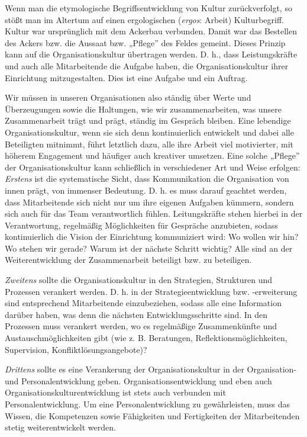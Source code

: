 \documentclass[
  letterpaper,
]{book}
\begin{document}
Wenn man die etymologische Begriffsentwicklung von Kultur
zurückverfolgt, so stößt man im Altertum auf einen ergologischen
(\emph{ergos}: Arbeit) Kulturbegriff. Kultur war ursprünglich mit dem
Ackerbau verbunden. Damit war das Bestellen des Ackers bzw. die Aussaat
bzw. „Pflege'' des Feldes gemeint. Dieses Prinzip kann auf die
Organisationskultur übertragen werden. D. h., dass Leistungskräfte und
auch alle Mitarbeitende die Aufgabe haben, die Organisationskultur ihrer
Einrichtung mitzugestalten. Dies ist eine Aufgabe und ein Auftrag.

Wir müssen in unseren Organisationen also ständig über Werte und
Überzeugungen sowie die Haltungen, wie wir zusammenarbeiten, was unsere
Zusammenarbeit trägt und prägt, ständig im Gespräch bleiben. Eine
lebendige Organisationskultur, wenn sie sich denn kontinuierlich
entwickelt und dabei alle Beteiligten mitnimmt, führt letztlich dazu,
alle ihre Arbeit viel motivierter, mit höherem Engagement und häufiger
auch kreativer umsetzen. Eine solche „Pflege'' der Organisationskultur
kann schließlich in verschiedener Art und Weise erfolgen: \emph{Erstens}
ist die systematische Sicht, dass Kommunikation die Organisation von
innen prägt, von immenser Bedeutung. D. h. es muss darauf geachtet
werden, dass Mitarbeitende sich nicht nur um ihre eigenen Aufgaben
kümmern, sondern sich auch für das Team verantwortlich fühlen.
Leitungskräfte stehen hierbei in der Verantwortung, regelmäßig
Möglichkeiten für Gespräche anzubieten, sodass kontinuierlich die Vision
der Einrichtung kommuniziert wird: Wo wollen wir hin? Wo stehen wir
gerade? Warum ist der nächste Schritt wichtig? Alle sind an der
Weiterentwicklung der Zusammenarbeit beteiligt bzw. zu beteiligen.

\emph{Zweitens} sollte die Organisationskultur in den Strategien,
Strukturen und Prozessen verankert werden. D. h. in der
Strategieentwicklung bzw. -erweiterung sind entsprechend Mitarbeitende
einzubeziehen, sodass alle eine Information darüber haben, was denn die
nächsten Entwicklungsschritte sind. In den Prozessen muss verankert
werden, wo es regelmäßige Zusammenkünfte und Austauschmöglichkeiten gibt
(wie z. B. Beratungen, Reflektionsmöglichkeiten, Supervision,
Konfliktlösungsangebote)?

\emph{Drittens} sollte es eine Verankerung der Organisationskultur in
der Organisation- und Personalentwicklung geben.
Organisationsentwicklung und eben auch Organisationskulturentwicklung
ist stets auch verbunden mit Personalentwicklung. Um eine
Personalentwicklung zu gewährleisten, muss das Wissen, die Kompetenzen
sowie Fähigkeiten und Fertigkeiten der Mitarbeitenden stetig
weiterentwickelt werden.
\end{document}
